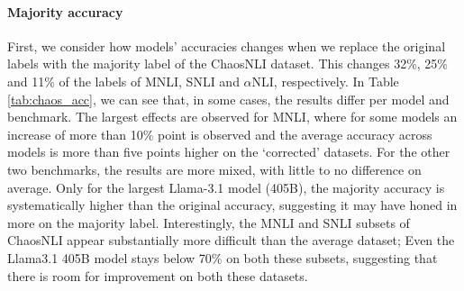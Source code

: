 \paragraph{Majority accuracy}
First, we consider how models' accuracies changes when we replace the original labels with the majority label of the ChaosNLI dataset.
This changes 32\%, 25\% and 11\% of the labels of MNLI, SNLI and $\alpha$NLI, respectively.
In Table \ref{tab:chaos_acc}, we can see that, in some cases, the results differ per model and benchmark.
The largest effects are observed for MNLI, where for some models an increase of more than 10\% point is observed and the average accuracy across models is more than five points higher on the `corrected' datasets.
For the other two benchmarks, the results are more mixed, with little to no difference on average.
Only for the largest Llama-3.1 model (405B), the majority accuracy is systematically higher than the original accuracy, suggesting it may have honed in more on the majority label.
Interestingly, the MNLI and SNLI subsets of ChaosNLI appear substantially more difficult than the average dataset;
Even the Llama3.1 405B model stays below 70\% on both these subsets, suggesting that there is room for improvement on both these datasets.

